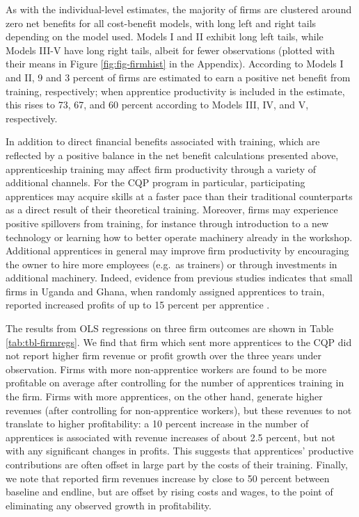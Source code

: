 \documentclass[
  a4paper, twoside, 12pt]{book}
\begin{document}
As with the individual-level estimates, the majority of firms are clustered around zero net benefits for all cost-benefit models, with long left and right tails depending on the model used. Models I and II exhibit long left tails, while Models III-V have long right tails, albeit for fewer observations (plotted with their means in Figure \ref{fig:fig-firmhist} in the Appendix). According to Models I and II, 9 and 3 percent of firms are estimated to earn a positive net benefit from training, respectively; when apprentice productivity is included in the estimate, this rises to 73, 67, and 60 percent according to Models III, IV, and V, respectively.

In addition to direct financial benefits associated with training, which are reflected by a positive balance in the net benefit calculations presented above, apprenticeship training may affect firm productivity through a variety of additional channels. For the CQP program in particular, participating apprentices may acquire skills at a faster pace than their traditional counterparts as a direct result of their theoretical training. Moreover, firms may experience positive spillovers from training, for instance through introduction to a new technology or learning how to better operate machinery already in the workshop. Additional apprentices in general may improve firm productivity by encouraging the owner to hire more employees (e.g.~as trainers) or through investments in additional machinery. Indeed, evidence from previous studies indicates that small firms in Uganda and Ghana, when randomly assigned apprentices to train, reported increased profits of up to 15 percent per apprentice \autocite{hardy2022,alfonsi2020}.

The results from OLS regressions on three firm outcomes are shown in Table \ref{tab:tbl-firmregs}. We find that firm which sent more apprentices to the CQP did not report higher firm revenue or profit growth over the three years under observation. Firms with more non-apprentice workers are found to be more profitable on average after controlling for the number of apprentices training in the firm. Firms with more apprentices, on the other hand, generate higher revenues (after controlling for non-apprentice workers), but these revenues to not translate to higher profitability: a 10 percent increase in the number of apprentices is associated with revenue increases of about 2.5 percent, but not with any significant changes in profits. This suggests that apprentices' productive contributions are often offset in large part by the costs of their training. Finally, we note that reported firm revenues increase by close to 50 percent between baseline and endline, but are offset by rising costs and wages, to the point of eliminating any observed growth in profitability.
\end{document}
